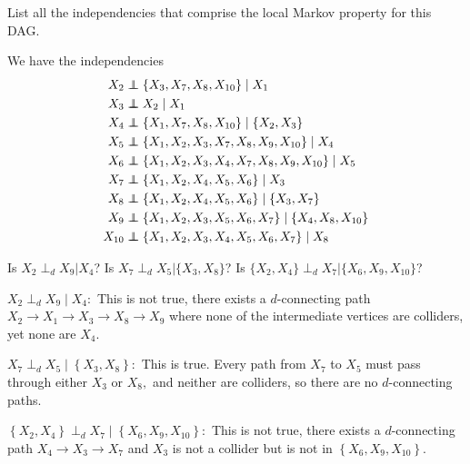 \documentclass[letterpaper]{article}
\def\independenT#1#2{\mathrel{\rlap{$#1#2$}\mkern2mu{#1#2}}}
\newcommand\indep{\protect\mathpalette{\protect\independenT}{\perp}}
\def\independenT#1#2{\mathrel{\rlap{$#1#2$}\mkern2mu{#1#2}}}
\begin{document}
\begin{enumerate}[a)]
  \ii List all the independencies that comprise the local Markov property for this DAG.
  \begin{answer*}
    We have the independencies
    \begin{align*}
      X_2 &\indep \left\{ X_3, X_7, X_8, X_{10} \right\}\mid X_1 \\
      X_3 &\indep X_2\mid X_1 \\
      X_4 &\indep \left\{ X_1, X_7, X_8, X_{10} \right\}\mid \left\{ X_2, X_3 \right\} \\
      X_5 &\indep \left\{ X_1, X_2, X_3, X_7, X_8, X_9, X_{10} \right\}\mid X_4 \\
      X_6 &\indep \left\{ X_1, X_2, X_3, X_4, X_7, X_8, X_9, X_{10} \right\} \mid X_5 \\
      X_7 &\indep \left\{ X_1, X_2, X_4, X_5, X_6 \right\}\mid X_3 \\
      X_8 &\indep \left\{ X_1, X_2, X_4, X_5, X_6 \right\}\mid \left\{ X_3, X_7 \right\} \\
      X_9 &\indep \left\{ X_1, X_2, X_3, X_5, X_6, X_7 \right\}\mid \left\{ X_4, X_8, X_{10} \right\} \\
      X_{10} &\indep \left\{ X_1, X_2, X_3, X_4, X_5, X_6, X_7 \right\}\mid X_8
    \end{align*}
  \end{answer*}


  \ii Is $X_2 \perp_d X_9 | X_4$? Is $X_7 \perp_d X_5 | \{X_3, X_8 \}$? Is $ \{X_2, X_4\} \perp_d X_7 | \{X_6, X_9, X_{10} \}$?
  \begin{answer*}
    $X_2\perp_d X_9\mid X_4:$ This is not true, there exists a $d$-connecting path $X_2\to X_1\to X_3\to X_8\to X_9$ where none of the intermediate vertices are colliders, yet none are $X_4.$

    $X_7\perp_d X_5\mid \left\{ X_3, X_8 \right\}:$ This is true. Every path from $X_7$ to $X_5$ must pass through either $X_3$ or $X_8,$ and neither are colliders, so there are no $d$-connecting paths.

    $\left\{ X_2, X_4 \right\}\perp_d X_7\mid \left\{ X_6, X_9, X_{10} \right\}:$ This is not true, there exists a $d$-connecting path $X_4\to X_3\to X_7$ and $X_3$ is not a collider but is not in $\left\{ X_6, X_9, X_{10} \right\}.$
  \end{answer*}

\end{enumerate}
\end{document}

